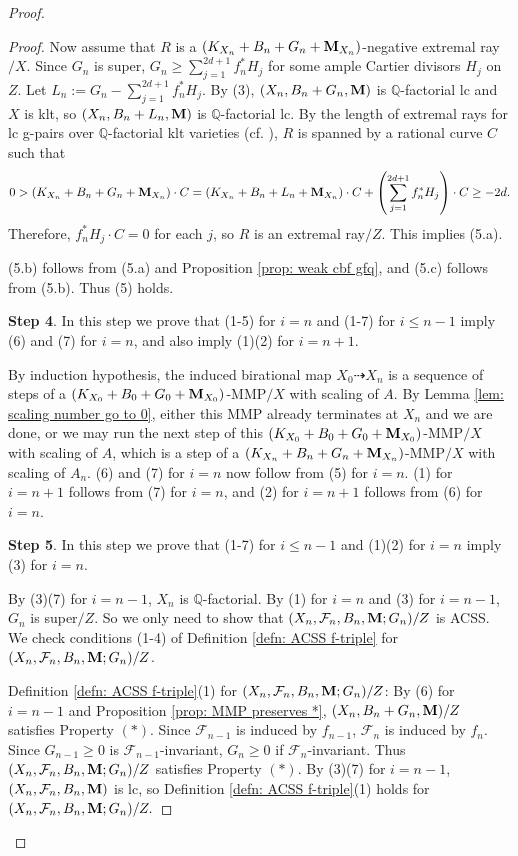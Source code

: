 \documentclass[11pt]{amsart}
\numberwithin{equation}{section}
\newcommand{\Mm}{{\bf{M}}}
\newcommand{\Qq}{\mathbb{Q}}
\newcommand{\Ff}{\mathcal{F}}
\theoremstyle{definition}
\theoremstyle{definition}
\theoremstyle{definition}
\begin{document}
\begin{proof}
\begin{proof}
Now assume that $R$ is a $(K_{X_n}+B_n+G_n+\Mm_{X_n})$-negative extremal ray$/X$. Since $G_n$ is super, $G_n\geq\sum_{j=1}^{2d+1}f_n^*H_j$ for some ample Cartier divisors $H_j$ on $Z$. Let $L_n:=G_n-\sum_{j=1}^{2d+1}f_n^*H_j$. By (3), $(X_n,B_n+G_n,\Mm)$ is $\Qq$-factorial lc and $X$ is klt, so $(X_n,B_n+L_n,\Mm)$ is $\Qq$-factorial lc. By the length of extremal rays for lc g-pairs over $\Qq$-factorial klt varieties (cf. \cite[Proposition 3.17]{HL22}), $R$ is spanned by a rational curve $C$ such that
$$0>(K_{X_n}+B_n+G_n+\Mm_{X_n})\cdot C=(K_{X_n}+B_n+L_n+\Mm_{X_n})\cdot C+\left(\sum_{j=1}^{2d+1}f_n^*H_j\right)\cdot C\geq -2d.$$
Therefore, $f_n^*H_j\cdot C=0$ for each $j$, so $R$ is an extremal ray$/Z$. This implies (5.a). 

(5.b) follows from (5.a) and Proposition \ref{prop: weak cbf gfq}, and (5.c) follows from (5.b). Thus (5) holds.

\medskip

\noindent\textbf{Step 4}. In this step we prove that (1-5) for $i=n$ and (1-7) for $i\leq n-1$ imply (6) and (7) for $i=n$, and also imply (1)(2) for $i=n+1$.

By induction hypothesis, the induced birational map $X_0\dashrightarrow X_n$ is a sequence of steps of a $(K_{X_0}+B_0+G_0+\Mm_{X_0})$-MMP$/X$ with scaling of $A$. By Lemma \ref{lem: scaling number go to 0}, either this MMP already terminates at $X_n$ and we are done, or we may run the next step of this $(K_{X_0}+B_0+G_0+\Mm_{X_0})$-MMP$/X$ with scaling of $A$, which is a step of a $(K_{X_n}+B_n+G_n+\Mm_{X_n})$-MMP$/X$ with scaling of $A_n$. (6)  and (7) for $i=n$ now follow from (5) for $i=n$. (1) for $i=n+1$ follows from (7) for $i=n$, and (2) for $i=n+1$ follows from (6) for $i=n$.

\medskip

\noindent\textbf{Step 5}. In this step we prove that (1-7) for $i\leq n-1$ and (1)(2) for $i=n$ imply (3) for $i=n$. 

By (3)(7) for $i=n-1$, $X_n$ is $\Qq$-factorial. By (1) for $i=n$ and (3) for $i=n-1$, $G_n$ is super$/Z$. So we only need to show that $(X_n,\Ff_n,B_n,\Mm;G_n)/Z$ is ACSS. We check conditions (1-4) of Definition \ref{defn: ACSS f-triple} for $(X_n,\Ff_n,B_n,\Mm;G_n)/Z$. 

Definition \ref{defn: ACSS f-triple}(1) for $(X_n,\Ff_n,B_n,\Mm;G_n)/Z$: By (6) for $i=n-1$ and Proposition \ref{prop: MMP preserves *}, $(X_n,B_n+G_n,\Mm)/Z$ satisfies Property $(*)$. Since $\Ff_{n-1}$ is induced by $f_{n-1}$, $\Ff_n$ is induced by $f_n$.  Since $G_{n-1}\geq 0$ is $\Ff_{n-1}$-invariant, $G_n\geq 0$ if $\Ff_n$-invariant. Thus  $(X_n,\Ff_n,B_n,\Mm;G_n)/Z$ satisfies Property $(*)$. By (3)(7) for $i=n-1$, $(X_n,\Ff_n,B_n,\Mm)$ is lc, so Definition \ref{defn: ACSS f-triple}(1) holds for $(X_n,\Ff_n,B_n,\Mm;G_n)/Z.$


\end{proof}
\end{proof}
\end{document}
